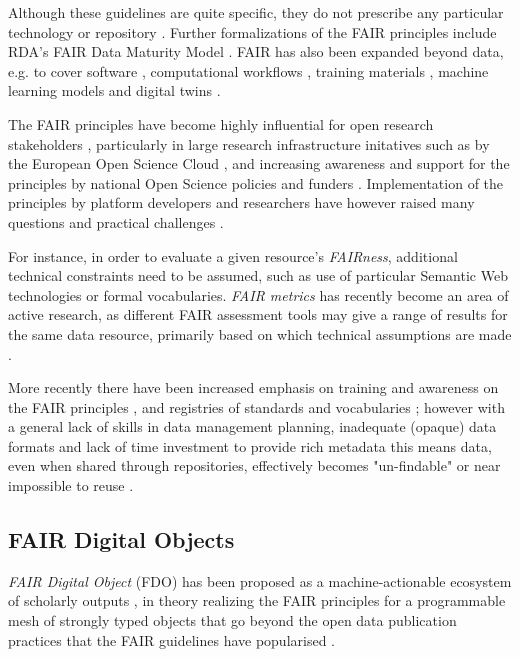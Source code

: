 Although these guidelines are quite specific, they do not prescribe any particular technology or repository \cite{Mons 2017}. Further formalizations of the FAIR principles include RDA's FAIR Data Maturity Model \cite{FAIR Maturity 2020,Bahui 2020}. FAIR has also been expanded beyond data, e.g. to cover software \cite{Katz 2021b}, computational workflows \cite{Goble 2020}, training materials \cite{Garcia 2020a}, machine learning models \cite{Duarte 2023} and digital twins \cite{Schultes 2022}. 

The FAIR principles have become highly influential for open research stakeholders \cite{Jacobsen 2020}, particularly in large research infrastructure initatives such as by the European Open Science Cloud  \cite{Schouppe 2018}, and increasing awareness and support for the principles by national Open Science policies and funders \cite{Davidson 2019,Davidson 2022}.
Implementation of the principles by platform developers and researchers have however raised many questions and practical challenges \cite{Mons 2020,Riungu-Kalliosaari 2022}. 

For instance, in order to evaluate a given resource's \emph{FAIRness}, additional technical constraints need to be assumed, such as use of particular Semantic Web technologies or formal vocabularies. \emph{FAIR metrics} \cite{Wilkinson 2018,Devaraju 2021} has recently become an area of active research, as different FAIR assessment tools may give a range of results for the same data resource, primarily based on which technical assumptions are made \cite{Wilkinson 2022a,Verburg 2023}.

More recently there have been increased emphasis on training and awareness on the FAIR principles \cite{Shanahan 2021,Rocca-Serra 2023}, and registries of standards and vocabularies \cite{Sansone 2019}; however with a general lack of skills in data management planning, inadequate (opaque) data formats and lack of time investment to provide rich metadata this means data, even when shared through repositories, effectively becomes "un-findable" or near impossible to reuse \cite{Carballo-Garcia 2022}.

\subsection{FAIR Digital Objects}

\emph{FAIR Digital Object} (FDO) has been proposed as a machine-actionable ecosystem of scholarly outputs \cite{Schultes 2019}, in theory realizing the FAIR principles \cite{Wilkinson 2016} for a programmable mesh of strongly typed objects that go beyond the open data publication practices that the FAIR guidelines have popularised \cite{Jacobsen 2020}.

